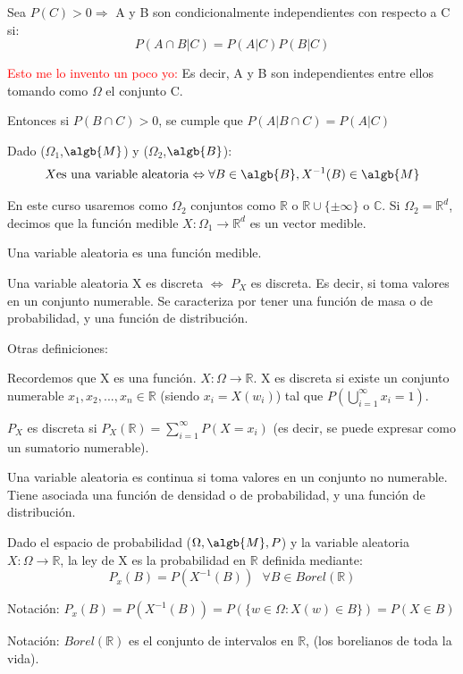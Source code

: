 \documentclass{apuntes}
\begin{document}
\begin{defn} Sea $P(C)>0 \Rightarrow$ A y B son condicionalmente independientes con respecto a C si: 
\[
P(A\cap B|C)=P(A|C)P(B|C)
\]

\textcolor{red}{Esto me lo invento un poco yo:} Es decir, A y B son independientes entre ellos tomando como $\Omega$ el conjunto C.

Entonces si $P(B\cap C)>0$, se cumple que $P(A|B\cap C)=P(A|C)$
\end{defn}

\begin{defn} 
Dado ($\Omega_1$,$\algb{M}$) y ($\Omega_2$,$\algb{B}$):
\[
X \text{es una variable aleatoria} \Leftrightarrow \forall B \in \algb{B}, X^{-1}(B) \in \algb{M}
\]

En este curso usaremos como $\Omega_2$ conjuntos como $\mathbb{R}$ o $\mathbb{R} \cup \{\pm \infty\}$ o $\mathbb{C}$. Si $\Omega_2 = \mathbb{R}^d$, decimos que la función medible $X: \Omega_1 \rightarrow \mathbb{R}^d$ es un vector medible.
\end{defn}
\obs Una variable aleatoria es una función medible.

\begin{defn}
Una variable aleatoria X es discreta $\Leftrightarrow$ $P_X$ es discreta. Es decir, si toma valores en un conjunto numerable. Se caracteriza por tener una función de masa o de probabilidad, y una función de distribución.

Otras definiciones:

Recordemos que X es una función. $X: \Omega \rightarrow \mathbb{R}$. X es discreta si existe un conjunto numerable $x_1, x_2,...,x_n \in \mathbb{R}$ (siendo $x_i=X(w_i)$) tal que $P(\bigcup_{i=1}^{\infty}x_i=1)$.

$P_X$ es discreta si $P_X(\mathbb{R})=\sum_{i=1}^{\infty}P(X=x_i)$ (es decir, se puede expresar como un sumatorio numerable).
\end{defn}

\begin{defn}
Una variable aleatoria es continua si toma valores en un conjunto no numerable. Tiene asociada una función de densidad o de probabilidad, y una función de distribución.
\end{defn}

\begin{defn}[ley de X]
Dado el espacio de probabilidad ($\Omega, \algb{M}, P$) y la variable aleatoria $X: \Omega \rightarrow \mathbb{R}$, la ley de X es la probabilidad en $\mathbb{R}$ definida mediante:
\[
P_x(B)=P(X^{-1}(B)) \text{ } \forall B \in Borel(\mathbb{R})
\]

Notación: $P_x(B) = P(X^{-1}(B)) = P(\{w \in \Omega : X(w) \in B\})=P(X \in B)$

Notación: $Borel(\mathbb{R})$ es el conjunto de intervalos en $\mathbb{R}$, (los borelianos de toda la vida).


\end{defn}
\end{document}
